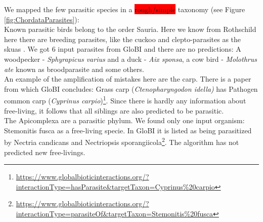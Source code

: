       We mapped the few parasitic species in a \colorbox{red}{rough/simple} taxonomy (see Figure \ref{fig:ChordataParasites}): \\
      Known parasitic birds belong to the order Sauria. Here we know from Rothschild  here there are 
        breeding parasites, like the cuckoo and clepto-parasites as the skuas \cite{Rothschild1957}. We
        got 6 input parasites from GloBI and there are no predictions: A woodpecker - 
        \textit{Sphyrapicus varius} and a duck - \textit{Aix sponsa}, a cow bird - \textit{Molothrus ate} 
        known as broodparasite and some others. \\
      An example of the amplification of mistakes here are the carp. There is a paper from which GloBI 
        concludes: Grass carp (\textit{Ctenopharyngodon idella)} has Pathogen common carp 
        (\textit{Cyprinus carpio})\footnote{
          \hyperlink{https://www.globalbioticinteractions.org/?interactionType=hasParasite&targetTaxon=Cyprinus\%20carpio}
          {https://www.globalbioticinteractions.org/?interactionType=hasParasite\&targetTaxon=Cyprinus\%20carpio}
        }. Since there is hardly any information about free-living, it follows that all siblings are 
        also predicted to be parasitic. \\

      The Apicomplexa are a parasitic phylum. We found only one input organism: Stemonitis fusca as a 
        free-living specie. In GloBI it is listed as being parasitized by Nectria candicans and Nectriopsis 
        sporangiicola\footnote{
          \hyperlink{https://www.globalbioticinteractions.org/?interactionType=parasiteOf&targetTaxon=Stemonitis\%20fusca}
          {https://www.globalbioticinteractions.org/?interactionType=parasiteOf\&targetTaxon=Stemonitis\%20fusca}
        }. The algorithm has not predicted new free-livings. \\

